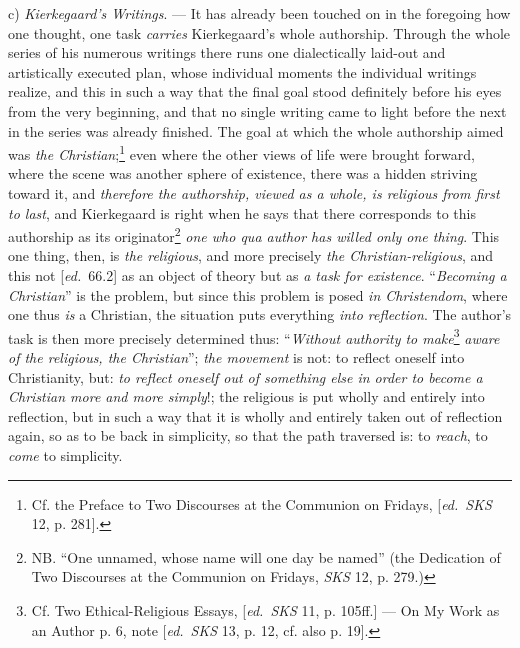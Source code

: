 \documentclass[12pt,a4paper,openany]{book}
\newcommand{\kpage}[1]{\marginnote{\footnotesize\textit{[#1]}}}
\newcommand{\ed}[1]{{\small[\textit{ed.}\ #1]}}
\begin{document}
\kpage{103}c) \emph{Kierkegaard's Writings}. --- It has already been touched on in the
foregoing how one thought, one task \emph{carries} Kierkegaard's whole
authorship. Through the whole series of his numerous writings there runs one
dialectically laid-out and artistically executed plan, whose individual moments
the individual writings realize, and this in such a way that the final goal
stood definitely before his eyes from the very beginning, and that no single
writing came to light before the next in the series was already finished. The
goal at which the whole authorship aimed was \emph{the
Christian};\footnote[28]{Cf. the Preface to Two Discourses at the Communion on
Fridays, \ed{\emph{SKS} 12, p. 281}.} even where the other views of life were
brought forward, where the scene was another sphere of existence, there was a
hidden striving toward it, and \emph{therefore the authorship, viewed as a whole,
is religious from first to last}, and Kierkegaard is right when he says that
there corresponds to this authorship as its originator\footnote[29]{NB. ``One
unnamed, whose name will one day be named'' (the Dedication of Two Discourses at
the Communion on Fridays, \emph{SKS} 12, p. 279.)} \emph{one who qua author has
willed only one thing}. This one thing, then, is \emph{the religious}, and more
precisely \emph{the Christian-religious}, and this not \ed{66.2} as an object of
theory but as \emph{a task for existence}. ``\emph{Becoming a Christian}'' is the
problem, but since this problem is posed \emph{in Christendom}, where one thus
\emph{is} a Christian, the situation puts everything \emph{into reflection}. The
author's task is then more precisely determined thus: ``\emph{Without authority
to make}\footnote[30]{Cf. Two Ethical-Religious Essays, \ed{\emph{SKS} 11, p.
105ff.} --- On My Work as an Author p. 6, note \ed{\emph{SKS} 13, p. 12, cf. also
p. 19}.} \emph{aware of the religious, the Christian}''; \emph{the movement} is
not: to reflect oneself into Christianity, but: \emph{to reflect oneself out of
something else in order to become a Christian more and more simply}!; the
religious is put wholly and entirely into reflection, but in such a way that it
is wholly and entirely taken out of reflection again, so as to be back in
simplicity, so that the path traversed is: to \emph{reach}, to \emph{come} to
simplicity.
\end{document}
